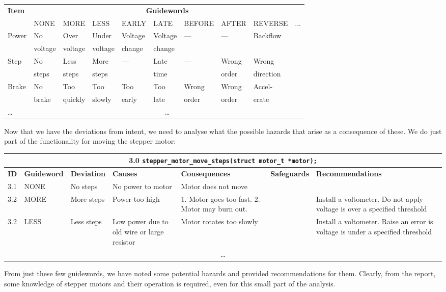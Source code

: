 \begin{example}
\begin{center}
\begin{tabular}{llllllllll}
\toprule
 \textbf{Item} & \multicolumn{9}{c}{\textbf{Guidewords}}\\
\cmidrule{2-10}
     & NONE & MORE & LESS & EARLY & LATE & BEFORE & AFTER & REVERSE & ...\\
\midrule
Power  & No & Over  & Under  & Voltage  & Voltage  & --- & --- & Backflow\\[-1mm]
       & voltage & voltage & voltage & change & change &  & & \\[1mm]
 Step  & No & Less & More & --- & Late & --- & Wrong & Wrong \\[-1mm]
       & steps & steps & steps & & time &  & order & direction\\[1mm]
 Brake & No & Too & Too & Too & Too & Wrong & Wrong & Accel-\\[-1mm]
       & brake & quickly & slowly & early & late & order & order & erate\\
 \ldots & \multicolumn{9}{c}{\ldots}\\
\bottomrule
\end{tabular}
\end{center}

Now that we have the deviations from intent, we need to analyse what the possible hazards that arise as a consequence of these. We do just part of the functionality for moving the stepper motor:

\begin{center}
\begin{tabular}{llp{2cm}p{2cm}p{2cm}p{2cm}p{3cm}}\\
\toprule
\multicolumn{7}{c}{3.0 \texttt{stepper\_motor\_move\_steps(struct motor\_t *motor);}}\\
\midrule
\textbf{ID} & \textbf{Guideword} & \textbf{Deviation} & 
 \textbf{Causes} & \textbf{Consequences} & \textbf{Safeguards} &
 \textbf{Recommendations}\\
\midrule
 3.1 & NONE & No steps & No power to motor & Motor does not move &  & \\[2mm]
 3.2 & MORE & More steps & Power too high &  1. Motor goes too fast. 2. Motor may burn out. &  & Install a voltometer. Do not apply voltage is over a specified threshold\\[2mm]
 3.2 & LESS & Less steps  & Low power due to old wire or large resistor & Motor rotates too slowly &  & Install a voltometer. Raise an error is voltage is under a specified threshold\\
 \multicolumn{7}{c}{\ldots}\\
\bottomrule
\end{tabular}
\end{center}

From just these few guidewords, we have noted some potential hazards and provided recommendations for them. Clearly, from the report, some knowledge of stepper motors and their operation is required, even for this small part of the analysis.
\end{example}



